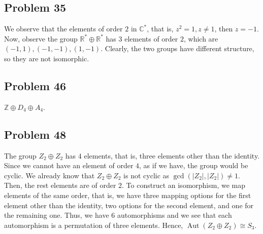 \documentclass[a4paper,12pt]{article}
\begin{document}
\subsection*{Problem 35}
We observe that the elements of order $2$ in $\mathbb{C}^*$, that is, $z^2=1, z\ne 1$, then $z=-1.$ Now, observe the group $\mathbb{R}^* \oplus \mathbb{R}^*$ has $3$ elements of order $2$, which are $(-1,1), (-1,-1), (1, -1).$ Clearly, the two groups have different structure, so they are not isomorphic.
\subsection*{Problem 46}
$\mathbb{Z} \oplus D_4 \oplus A_4.$
\subsection*{Problem 48}
The group $Z_2 \oplus Z_2$ has $4$ elements, that is, three elements other than the identity. Since we cannot have an element of order $4$, as if we have, the group would be cyclic. We already know that $Z_2 \oplus Z_2$ is not cyclic as $\gcd(|Z_2|,|Z_2|)\ne 1.$ 
Then, the rest elements are of order $2$. To construct an isomorphism, we map elements of the same order, that is, we have three mapping options for the first element other than the identity, two options for the second element, and one for the remaining one. Thus, we have $6$ automorphisms and we see that each automorphism is a permutation of three elements. Hence, $\operatorname{Aut}(Z_2\oplus Z_2) \cong S_3.$
\end{document}
